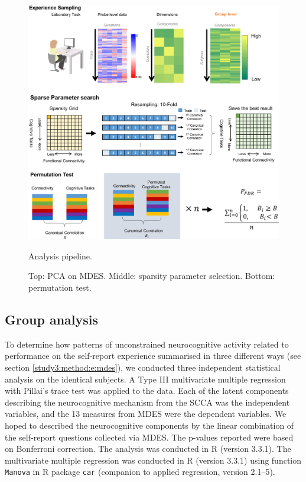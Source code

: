 \begin{figure}[H]
    \centering
    \includegraphics[width=1\textwidth]{study3/image/study3fig1.jpg}
    \caption{Analysis pipeline.}
    \label{fig:study3:fig1}
    \caption*{\footnotesize{
    Top: PCA on MDES.
    Middle: sparsity parameter selection.
    Bottom: permutation test.
    }} %
\end{figure}

\subsection{Group analysis}
\label{study3:method:g}

To determine how patterns of unconstrained neurocognitive activity related to performance on the self-report experience summarised in three different ways (see section \ref{study3:method:e:mdes}),
we conducted three independent statistical analysis on the identical subjects. A Type III multivariate multiple regression with Pillai's trace test was applied to the data. Each of the latent components describing the neurocognitive mechanism from the SCCA was the independent variables, and the 13 measures from MDES were the dependent variables. We hoped to described the neurocognitive components by the linear combination of the self-report questions collected via MDES. The p-values reported were based on Bonferroni correction. The analysis was conducted in R (version 3.3.1). The multivariate multiple regression was conducted in R (version 3.3.1) using function \texttt{Manova} in R package \texttt{car} (companion to applied regression, version 2.1–5).

